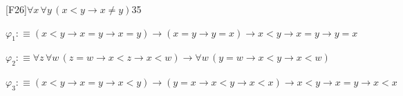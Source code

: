\begin{fullproof}{[F26]}{$\forall x\,\forall y\,(x < y \to x \neq y)$}{35}
\begin{ptree}
\noLine
{}
\end{ptree}
\begin{abbrevlist}
\item $\varphi_{1} :\equiv (x < y \to x = y \to x = y) \to (x = y \to y = x) \to x < y \to x = y \to y = x$
\item $\varphi_{2} :\equiv \forall z\,\forall w\,(z = w \to x < z \to x < w) \to \forall w\,(y = w \to x < y \to x < w)$
\item $\varphi_{3} :\equiv (x < y \to x = y \to x < y) \to (y = x \to x < y \to x < x) \to x < y \to x = y \to x < x$
\end{abbrevlist}
\end{fullproof}
